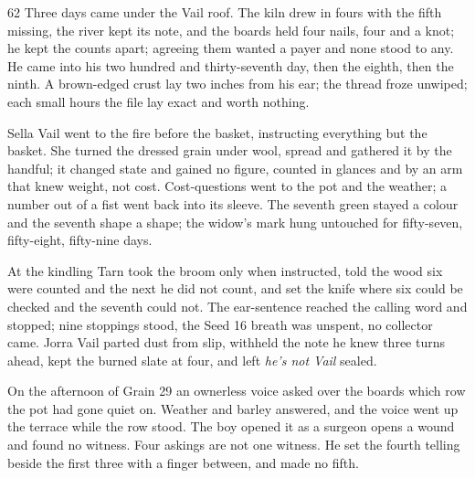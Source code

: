 
\scenebreak


\scenebreak


\scenebreak

\CRtailpiece
\begin{CRchronicle}{62}
Three days came under the Vail roof. The kiln drew in fours with the fifth missing, the river kept its note, and the boards held four nails, four and a knot; he kept the counts apart; agreeing them wanted a payer and none stood to any. He came into his two hundred and thirty-seventh day, then the eighth, then the ninth. A brown-edged crust lay two inches from his ear; the thread froze unwiped; each small hours the file lay exact and worth nothing.

Sella Vail went to the fire before the basket, instructing everything but the basket. She turned the dressed grain under wool, spread and gathered it by the handful; it changed state and gained no figure, counted in glances and by an arm that knew weight, not cost. Cost-questions went to the pot and the weather; a number out of a fist went back into its sleeve. The seventh green stayed a colour and the seventh shape a shape; the widow’s mark hung untouched for fifty-seven, fifty-eight, fifty-nine days.

At the kindling Tarn took the broom only when instructed, told the wood six were counted and the next he did not count, and set the knife where six could be checked and the seventh could not. The ear-sentence reached the calling word and stopped; nine stoppings stood, the Seed 16 breath was unspent, no collector came. Jorra Vail parted dust from slip, withheld the note he knew three turns ahead, kept the burned slate at four, and left \emph{he’s not Vail} sealed.

On the afternoon of Grain 29 an ownerless voice asked over the boards which row the pot had gone quiet on. Weather and barley answered, and the voice went up the terrace while the row stood. The boy opened it as a surgeon opens a wound and found no witness. Four askings are not one witness. He set the fourth telling beside the first three with a finger between, and made no fifth.


\end{CRchronicle}
